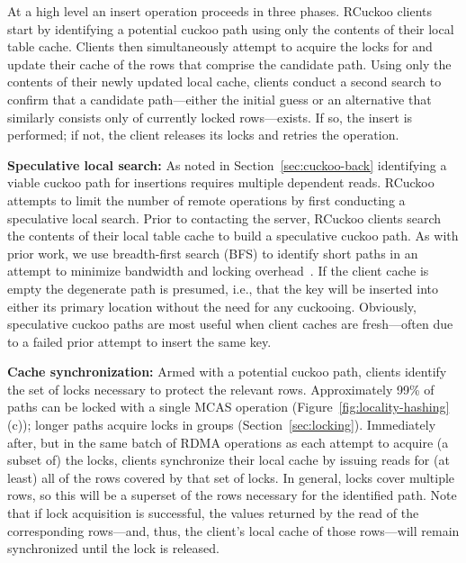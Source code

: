 At a high level an insert operation proceeds in three phases.  RCuckoo
clients start by identifying a potential cuckoo path using only the
contents of their local table cache.  Clients then simultaneously
attempt to acquire the locks for and update their cache of the rows
that comprise the candidate path.  Using only the contents of their
newly updated local cache, clients conduct a second search to confirm
that a candidate path---either the initial guess or an alternative
that similarly consists only of currently locked rows---exists.  If
so, the insert is performed; if not, the client releases its locks and
retries the operation.

\textbf{Speculative local search:} As noted in
Section~\ref{sec:cuckoo-back} identifying a viable cuckoo path for
insertions requires multiple dependent reads.  RCuckoo attempts to
limit the number of remote operations by first conducting a
speculative local search. Prior to contacting the server, RCuckoo
clients search the contents of their local table cache to build a
speculative cuckoo path.  As with prior work, we use breadth-first
search (BFS) to identify short paths in an attempt to minimize
bandwidth and locking overhead~\cite{cuckoo-improvements}.  If the
client cache is empty the degenerate path is presumed, i.e., that the
key will be inserted into either its primary location
without the need for any cuckooing.  Obviously, speculative cuckoo
paths are most useful when client caches are fresh---often due to a
failed prior attempt to insert the same key.


\textbf{Cache synchronization:} Armed with a potential
cuckoo path, clients identify the set of locks necessary to
protect the relevant rows.  
Approximately 99\% of paths can be locked with a single MCAS
operation (Figure~\ref{fig:locality-hashing}(c)); longer
paths acquire locks in groups (Section~\ref{sec:locking}).
Immediately after, but in the same batch of RDMA operations
as each attempt to acquire (a subset of) the locks, clients
synchronize their local cache by issuing reads for (at
least) all of the rows covered by that set of locks.  In
general, locks cover multiple rows, so this will be a
superset of the rows necessary for the identified path.
Note that if lock acquisition is successful, the values
returned by the read of the corresponding rows---and, thus,
the client's local cache of those rows---will remain
synchronized until the lock is released.

